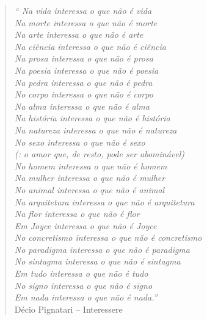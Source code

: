 







\begin{quote} {\small
\textit{
``
Na vida interessa o que não é vida\\ Na morte interessa o que não é morte\\
Na arte interessa o que não é arte\\
Na ciência interessa o que não é ciência\\
Na prosa interessa o que não é prosa\\
Na poesia interessa o que não é poesia\\
Na pedra interessa o que não é pedra\\
No corpo interessa o que não é corpo\\
Na alma interessa o que não é alma\\
Na história interessa o que não é história\\
Na natureza interessa o que não é natureza\\
No sexo interessa o que não é sexo\\
(: o amor que, de resto, pode ser abominável)\\
No homem interessa o que não é homem\\
Na mulher interessa o que não é mulher\\
No animal interessa o que não é animal\\
Na arquitetura interessa o que não é arquitetura\\
Na flor interessa o que não é flor\\
Em Joyce interessa o que não é Joyce\\
No concretismo interessa o que não é concretismo\\
No paradigma interessa o que não é paradigma\\
No sintagma interessa o que não é sintagma\\
Em tudo interessa o que não é tudo\\
No signo interessa o que não é signo\\
Em nada interessa o que não é nada.''
} \\
Décio Pignatari – Interessere    
}\end{quote}











